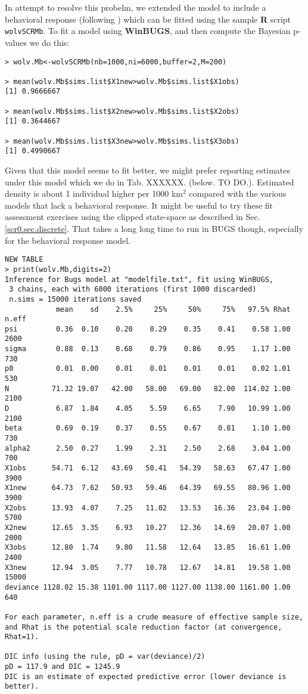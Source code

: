 In attempt to resolve this probelm, we extended the model to include a
behavioral response (following \citet{royle_etal:2011jwm}) which can
be fitted using the sample {\bf R} script \mbox{\tt
  wolvSCRMb}. To fit a model using {\bf WinBUGS}, and then compute the
Bayesian p-values we do this:
\begin{verbatim}
> wolv.Mb<-wolvSCRMb(nb=1000,ni=6000,buffer=2,M=200)

> mean(wolv.Mb$sims.list$X1new>wolv.Mb$sims.list$X1obs)
[1] 0.9666667

> mean(wolv.Mb$sims.list$X2new>wolv.Mb$sims.list$X2obs)
[1] 0.3644667

> mean(wolv.Mb$sims.list$X3new>wolv.Mb$sims.list$X3obs)
[1] 0.4990667
\end{verbatim}
Given that this model seems to fit better, we might prefer reporting
estimates under this model which we do in
Tab. XXXXXX. (below. TO DO.).
Estimated density is about 1 individual higher per 1000 km$^2$
compared with the various models that lack a behavioral response.
It might be useful to try these fit assessment exercises using the
clipped state-space as described in Sec. \ref{scr0.sec.discrete}. That takes a long
long time to run in \mbox{BUGS} though, especially for the behavioral
response model.
{\small
\begin{verbatim}
NEW TABLE
> print(wolv.Mb,digits=2)
Inference for Bugs model at "modelfile.txt", fit using WinBUGS,
 3 chains, each with 6000 iterations (first 1000 discarded)
 n.sims = 15000 iterations saved
            mean    sd    2.5%     25%     50%     75%   97.5% Rhat n.eff
psi         0.36  0.10    0.20    0.29    0.35    0.41    0.58 1.00  2600
sigma       0.88  0.13    0.68    0.79    0.86    0.95    1.17 1.00   730
p0          0.01  0.00    0.01    0.01    0.01    0.01    0.02 1.01   530
N          71.32 19.07   42.00   58.00   69.00   82.00  114.02 1.00  2100
D           6.87  1.84    4.05    5.59    6.65    7.90   10.99 1.00  2100
beta        0.69  0.19    0.37    0.55    0.67    0.81    1.10 1.00   730
alpha2      2.50  0.27    1.99    2.31    2.50    2.68    3.04 1.00   700
X1obs      54.71  6.12   43.69   50.41   54.39   58.63   67.47 1.00  3900
X1new      64.73  7.62   50.93   59.46   64.39   69.55   80.96 1.00  3900
X2obs      13.93  4.07    7.25   11.02   13.53   16.36   23.04 1.00  5700
X2new      12.65  3.35    6.93   10.27   12.36   14.69   20.07 1.00  2000
X3obs      12.80  1.74    9.80   11.58   12.64   13.85   16.61 1.00  2400
X3new      12.94  3.05    7.77   10.78   12.67   14.81   19.58 1.00 15000
deviance 1128.02 15.38 1101.00 1117.00 1127.00 1138.00 1161.00 1.00   640

For each parameter, n.eff is a crude measure of effective sample size,
and Rhat is the potential scale reduction factor (at convergence, Rhat=1).

DIC info (using the rule, pD = var(deviance)/2)
pD = 117.9 and DIC = 1245.9
DIC is an estimate of expected predictive error (lower deviance is better).
\end{verbatim}
}




